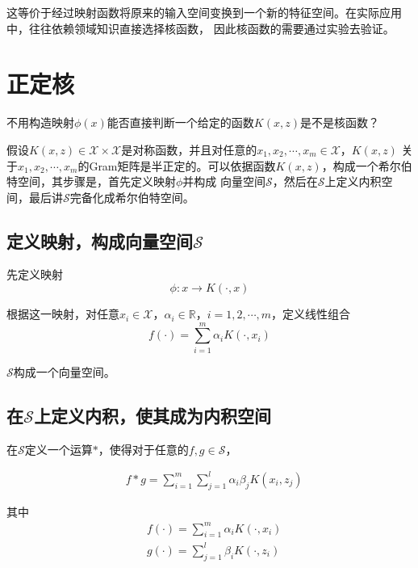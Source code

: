 这等价于经过映射函数将原来的输入空间变换到一个新的特征空间。在实际应用中，往往依赖领域知识直接选择核函数，
因此核函数的需要通过实验去验证。

\section{正定核}

不用构造映射$\phi(x)$能否直接判断一个给定的函数$K(x,z)$是不是核函数？

假设$K(x,z)\in \mathcal{X}\times \mathcal{X}$是对称函数，并且对任意的$x_1,x_2,\cdots,x_m\in \mathcal{X}$，$K(x,z)$
关于$x_1,x_2,\cdots,x_m$的Gram矩阵是半正定的。可以依据函数$K(x,z)$，构成一个希尔伯特空间，其步骤是，首先定义映射$\phi$并构成
向量空间$\mathcal{S}$，然后在$\mathcal{S}$上定义内积空间，最后讲$\mathcal{S}$完备化成希尔伯特空间。

\subsection*{定义映射，构成向量空间$\mathcal{S}$}

先定义映射
\begin{equation}
    \phi:x\rightarrow K(\cdot,x)
\end{equation}

根据这一映射，对任意$x_i\in \mathcal{X}$，$\alpha_i\in \mathbb{R}$，$i=1,2,\cdots,m$，定义线性组合
\begin{equation}
    f(\cdot)=\sum\limits_{i=1}^{m}\alpha_iK(\cdot,x_i)
\end{equation}


$\mathcal{S}$构成一个向量空间。

\subsection*{在$\mathcal{S}$上定义内积，使其成为内积空间}


在$\mathcal{S}$定义一个运算$*$，使得对于任意的$f,g\in\mathcal{S}$，

\begin{eqnarray}
    & f*g=\sum\limits_{i=1}^{m}\sum\limits_{j=1}^{l}\alpha_i\beta_jK(x_i,z_j)
\end{eqnarray}

其中
\begin{eqnarray}
    & f(\cdot)=\sum\limits_{i=1}^{m}\alpha_iK(\cdot,x_i)\\
    & g(\cdot)=\sum\limits_{j=1}^{l}\beta_iK(\cdot,z_i)
\end{eqnarray}

